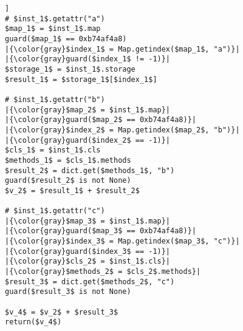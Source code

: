 {\noop
\begin{lstlisting}[mathescape,escapechar=|,basicstyle=\ttfamily]]
# $inst_1$.getattr("a")
$map_1$ = $inst_1$.map
guard($map_1$ == 0xb74af4a8)
|{\color{gray}$index_1$ = Map.getindex($map_1$, "a")}|
|{\color{gray}guard($index_1$ != -1)}|
$storage_1$ = $inst_1$.storage
$result_1$ = $storage_1$[$index_1$]

# $inst_1$.getattr("b")
|{\color{gray}$map_2$ = $inst_1$.map}|
|{\color{gray}guard($map_2$ == 0xb74af4a8)}|
|{\color{gray}$index_2$ = Map.getindex($map_2$, "b")}|
|{\color{gray}guard($index_2$ == -1)}|
$cls_1$ = $inst_1$.cls
$methods_1$ = $cls_1$.methods
$result_2$ = dict.get($methods_1$, "b")
guard($result_2$ is not None)
$v_2$ = $result_1$ + $result_2$

# $inst_1$.getattr("c")
|{\color{gray}$map_3$ = $inst_1$.map}|
|{\color{gray}guard($map_3$ == 0xb74af4a8)}|
|{\color{gray}$index_3$ = Map.getindex($map_3$, "c")}|
|{\color{gray}guard($index_3$ == -1)}|
|{\color{gray}$cls_2$ = $inst_1$.cls}|
|{\color{gray}$methods_2$ = $cls_2$.methods}|
$result_3$ = dict.get($methods_2$, "c")
guard($result_3$ is not None)

$v_4$ = $v_2$ + $result_3$
return($v_4$)
\end{lstlisting}
}
